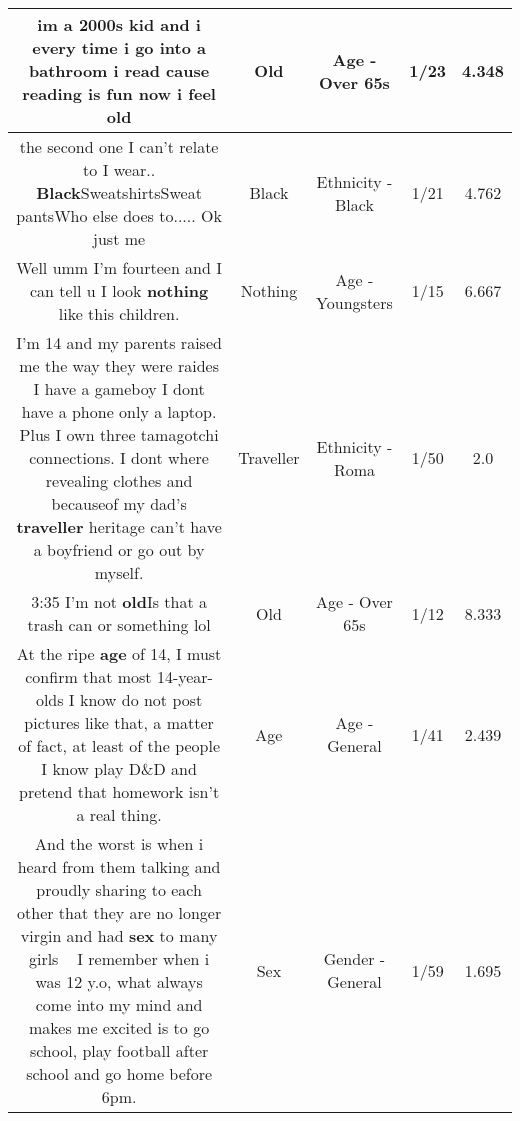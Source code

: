 \documentclass[11pt]{article}
\newlength\mylength
\begin{document}
\begin{center}
\begin{longtable}{|C{.65\mylength}|C{.30\mylength}|C{.12\mylength}|C{.12\mylength}|C{.12\mylength}|}
  \small im a 2000s kid and i every time i go into a bathroom i read cause reading is fun now i feel old\normalsize   & Old & Age - Over 65s & 1/23 & 4.348 \\  \hline
  \small the second one I can't relate to I wear.. \textbf{Black}SweatshirtsSweat pantsWho else does to..... Ok just me\normalsize   & Black & Ethnicity - Black & 1/21 & 4.762 \\  \hline
  \small Well umm I'm fourteen and I can tell u I look \textbf{nothing} like this children.\normalsize   & Nothing & Age - Youngsters & 1/15 & 6.667 \\  \hline
  \small I'm 14 and my parents raised me the way they were raides I have a gameboy I dont have a phone only a laptop. Plus I own three tamagotchi connections. I dont where revealing clothes and becauseof my dad's \textbf{traveller} heritage can't have a boyfriend or go out by myself.\normalsize   & Traveller & Ethnicity - Roma & 1/50 & 2.0 \\  \hline
  \small 3:35 I'm not \textbf{old}Is that a trash can or something lol\normalsize   & Old & Age - Over 65s & 1/12 & 8.333 \\  \hline
  \small At the ripe \textbf{age} of 14, I must confirm that most 14-year-olds I know do not post pictures like that, a matter of fact, at least of the people I know play D\&D and pretend that homework isn't a real thing.\normalsize   & Age & Age - General & 1/41 & 2.439 \\  \hline
  \small And the worst is when i heard  from them talking and proudly sharing to each other that they are no longer virgin and had \textbf{sex} to many girls 🤦🏻‍♂️I remember when i was 12 y.o, what always come into my mind and makes me excited is to go school, play football after school and go home before 6pm.\normalsize   & Sex & Gender - General & 1/59 & 1.695 \\  \hline

\end{longtable}
\end{center}
\end{document}

